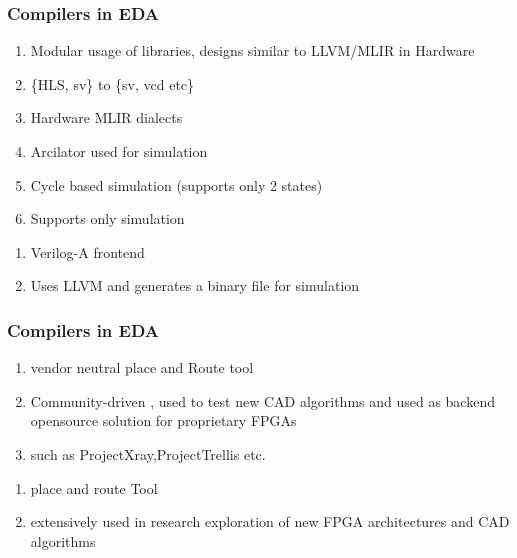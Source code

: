 \documentclass{beamer}
\begin{document}
\begin{frame}[fragile]
    \frametitle{Compilers in EDA}
        \begin{enumerate}
            \item Modular usage of libraries, designs similar to LLVM/MLIR in Hardware  
            \item \{HLS, sv\} to \{sv, vcd etc\}
            \item Hardware MLIR  dialects 
            \item Arcilator used for simulation 
                \item Cycle based simulation (supports only 2 states)
            \item Supports only simulation 
        \end{enumerate}
        \begin{enumerate}
            \item Verilog-A frontend 
            \item Uses LLVM and generates a binary file for simulation
        \end{enumerate}
\end{frame}

\begin{frame}[fragile]
   \frametitle{Compilers in EDA}
   \begin{enumerate}
   	\item vendor neutral place and Route tool 
	\item Community-driven , used to test new CAD algorithms and used as backend opensource solution for proprietary FPGAs 
	\item such as ProjectXray,ProjectTrellis etc.
   \end{enumerate}

   \begin{enumerate}
   	\item place and route Tool 
	\item extensively used in research exploration of new FPGA architectures and CAD algorithms
   \end{enumerate}
\end{frame}
\end{document}
